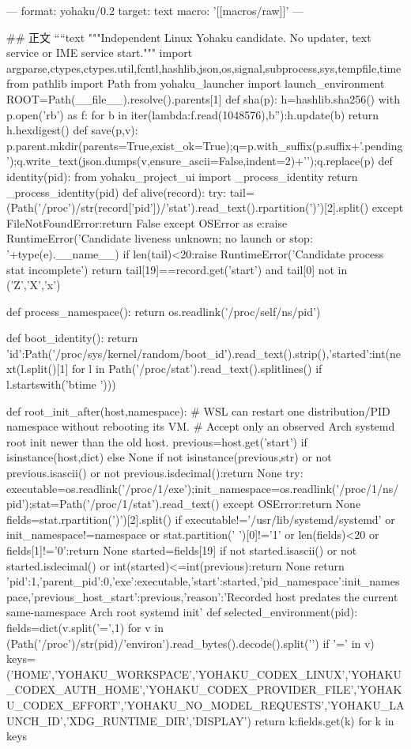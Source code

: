 ---
format: yohaku/0.2
target: text
macro: '[[macros/raw]]'
---

## 正文
````text
"""Independent Linux Yohaku candidate. No updater, text service or IME service start."""
import argparse,ctypes,ctypes.util,fcntl,hashlib,json,os,signal,subprocess,sys,tempfile,time
from pathlib import Path
from yohaku_launcher import launch_environment
ROOT=Path(__file__).resolve().parents[1]
def sha(p):
 h=hashlib.sha256()
 with p.open('rb') as f:
  for b in iter(lambda:f.read(1048576),b''):h.update(b)
 return h.hexdigest()
def save(p,v):
 p.parent.mkdir(parents=True,exist_ok=True);q=p.with_suffix(p.suffix+'.pending');q.write_text(json.dumps(v,ensure_ascii=False,indent=2)+'\n');q.replace(p)
def identity(pid):
 from yohaku_project_ui import _process_identity
 return _process_identity(pid)
def alive(record):
 try:
  tail=(Path('/proc')/str(record['pid'])/'stat').read_text().rpartition(')')[2].split()
 except FileNotFoundError:return False
 except OSError as e:raise RuntimeError('Candidate liveness unknown; no launch or stop: '+type(e).__name__)
 if len(tail)<20:raise RuntimeError('Candidate process stat incomplete')
 return tail[19]==record.get('start') and tail[0] not in ('Z','X','x')

def process_namespace():
 return os.readlink('/proc/self/ns/pid')

def boot_identity():
 return {'id':Path('/proc/sys/kernel/random/boot_id').read_text().strip(),'started':int(next(l.split()[1] for l in Path('/proc/stat').read_text().splitlines() if l.startswith('btime ')))}

def root_init_after(host,namespace):
 # WSL can restart one distribution/PID namespace without rebooting its VM.
 # Accept only an observed Arch systemd root init newer than the old host.
 previous=host.get('start') if isinstance(host,dict) else None
 if not isinstance(previous,str) or not previous.isascii() or not previous.isdecimal():return None
 try:
  executable=os.readlink('/proc/1/exe');init_namespace=os.readlink('/proc/1/ns/pid');stat=Path('/proc/1/stat').read_text()
 except OSError:return None
 fields=stat.rpartition(')')[2].split()
 if executable!='/usr/lib/systemd/systemd' or init_namespace!=namespace or stat.partition(' ')[0]!='1' or len(fields)<20 or fields[1]!='0':return None
 started=fields[19]
 if not started.isascii() or not started.isdecimal() or int(started)<=int(previous):return None
 return {'pid':1,'parent_pid':0,'exe':executable,'start':started,'pid_namespace':init_namespace,'previous_host_start':previous,'reason':'Recorded host predates the current same-namespace Arch root systemd init'}
def selected_environment(pid):
 fields=dict(v.split('=',1) for v in (Path('/proc')/str(pid)/'environ').read_bytes().decode().split('\0') if '=' in v)
 keys=('HOME','YOHAKU_WORKSPACE','YOHAKU_CODEX_LINUX','YOHAKU_CODEX_AUTH_HOME','YOHAKU_CODEX_PROVIDER_FILE','YOHAKU_CODEX_EFFORT','YOHAKU_NO_MODEL_REQUESTS','YOHAKU_LAUNCH_ID','XDG_RUNTIME_DIR','DISPLAY')
 return {k:fields.get(k) for k in keys}

